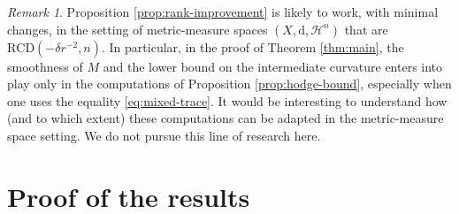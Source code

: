 \documentclass[11pt]{amsart}
\theoremstyle{definition}
\theoremstyle{remark}
\newtheorem{remark}[theorem]{Remark}
\begin{document}
\begin{remark}\label{rem:mms}
    Proposition \ref{prop:rank-improvement} is likely to work, with minimal changes, in the setting of metric-measure spaces $(X,\mathrm{d},\mathcal{H}^n)$ that are $\mathrm{RCD}(-\delta r^{-2},n)$. In particular, in the proof of Theorem \ref{thm:main}, the smoothness of $M$ and the lower bound on the intermediate curvature enters into play only in the computations of Proposition \ref{prop:hodge-bound}, especially when one uses the equality \eqref{eq:mixed-trace}. It would be interesting to understand how (and to which extent) these computations can be adapted in the metric-measure space setting.  We do not pursue this line of research here.
\end{remark}

\section{Proof of the results}
\end{document}
